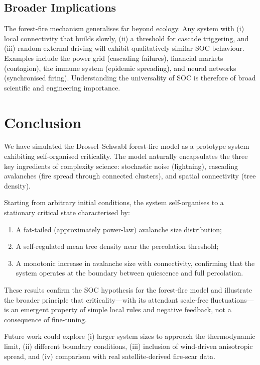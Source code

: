 \documentclass[12pt,a4paper]{article}
\begin{document}
\subsection{Broader Implications}

The forest-fire mechanism generalises far beyond ecology.
Any system with (i) local connectivity that builds slowly, (ii) a threshold
for cascade triggering, and (iii) random external driving will exhibit
qualitatively similar SOC behaviour.
Examples include the power grid (cascading failures), financial markets
(contagion), the immune system (epidemic spreading), and neural networks
(synchronised firing).
Understanding the universality of SOC is therefore of broad scientific and
engineering importance.

\clearpage
\section{Conclusion}
\label{sec:conclusion}

We have simulated the Drossel--Schwabl forest-fire model as a prototype
system exhibiting self-organised criticality.
The model naturally encapsulates the three key ingredients of complexity
science: stochastic noise (lightning), cascading avalanches (fire spread
through connected clusters), and spatial connectivity (tree density).

Starting from arbitrary initial conditions, the system self-organises to
a stationary critical state characterised by:
\begin{enumerate}
  \item A fat-tailed (approximately power-law) avalanche size distribution;
  \item A self-regulated mean tree density near the percolation threshold;
  \item A monotonic increase in avalanche size with connectivity, confirming
        that the system operates at the boundary between quiescence and
        full percolation.
\end{enumerate}

These results confirm the SOC hypothesis for the forest-fire model and
illustrate the broader principle that criticality---with its attendant
scale-free fluctuations---is an emergent property of simple local rules
and negative feedback, not a consequence of fine-tuning.

Future work could explore (i) larger system sizes to approach the
thermodynamic limit, (ii) different boundary conditions, (iii) inclusion
of wind-driven anisotropic spread, and (iv) comparison with real
satellite-derived fire-scar data.
\end{document}
